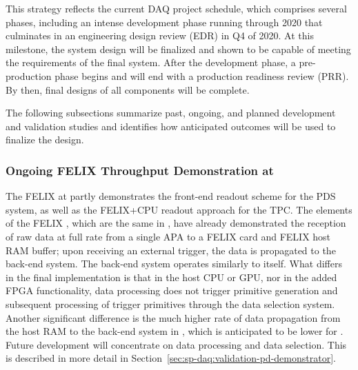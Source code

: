 This strategy reflects the current DAQ project schedule, which
comprises several phases, including an intense development phase
running through 2020 that culminates in an engineering design
review (EDR) in Q4 of 2020. At this milestone, the system design will be
finalized and shown to be capable of meeting the requirements of the
final  system. After the development phase, a
pre-production phase begins and will end with a production readiness
review (PRR). By then, final designs of all components
will be complete.

The following subsections summarize past, ongoing, and planned
development and validation studies and identifies how anticipated outcomes
will be used to finalize the  design.

\subsubsection{Ongoing FELIX Throughput Demonstration at }
\label{sec:sp-daq:validation-pdune-felix}


The FELIX  at  partly demonstrates the front-end readout scheme for
the PDS system, as well as the FELIX+CPU readout approach for the
TPC. The elements of the  FELIX , which are the
same in , have already demonstrated the
reception of raw data at full rate from a single APA to a 
FELIX card and FELIX host RAM buffer; upon receiving an external trigger, the
data is propagated to the back-end system. The back-end system
operates similarly to  itself. What differs in the final 
implementation is that in the host CPU or
GPU, nor in the added FPGA functionality, data processing does not trigger primitive generation and subsequent processing
of trigger primitives through the data selection system. Another
significant difference is the much higher rate of data propagation from the
host RAM to the back-end system in , which is anticipated to be lower for . Future development
will concentrate on data processing and data selection.  This is described in more detail in Section~\ref{sec:sp-daq:validation-pd-demonstrator}.

